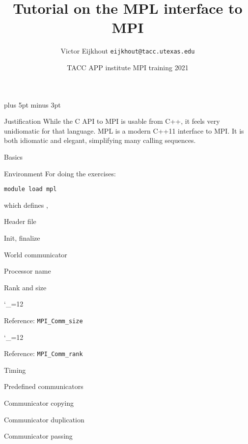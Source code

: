 \documentclass[11pt,headernav]{beamer}
\newcommand\referenceframe{\begingroup\catcode`\_=12 \referenceframett}
\gdef\referenceframett#1{
  \begin{numberedframe}{Reference: \texttt{MPI_#1}}
    \small
    
  \end{numberedframe}\endgroup}
\def\Location{}%
\def\courseyear{2021}
\def\Location{TACC APP institute MPI training \courseyear}
\begin{document}
\parskip=10pt plus 5pt minus 3pt

\title{Tutorial on the MPL interface to MPI}
\author{Victor Eijkhout {\tt eijkhout@tacc.utexas.edu}}
\date{\Location}

\begin{frame}
  \titlepage
\end{frame}

\begin{frame}{Justification}
  While the C API to MPI is usable from C++, it feels very unidiomatic
  for that language.
  \acf{MPL} is a modern C++11 interface to MPI.
  It is both idiomatic and elegant, simplifying many calling sequences.
\end{frame}

 {Basics}

\begin{numberedframe}{Environment}
  For doing the exercises:
\begin{verbatim}
module load mpl
\end{verbatim}
which defines , 
\end{numberedframe}

\begin{numberedframe}{Header file}
  
\end{numberedframe}
\begin{numberedframe}{Init, finalize}
  
\end{numberedframe}
\begin{numberedframe}{World communicator}
  
\end{numberedframe}
\begin{numberedframe}{Processor name}
  
\end{numberedframe}
\begin{numberedframe}{Rank and size}
  
\end{numberedframe}
\referenceframe{Comm_size}
\referenceframe{Comm_rank}

\begin{numberedframe}{Timing}
  
\end{numberedframe}
\begin{numberedframe}{Predefined communicators}
  
\end{numberedframe}
\begin{numberedframe}{Communicator copying}
  
\end{numberedframe}
\begin{numberedframe}{Communicator duplication}
  
\end{numberedframe}
\begin{numberedframe}{Communicator passing}
  
\end{numberedframe}
\end{document}
